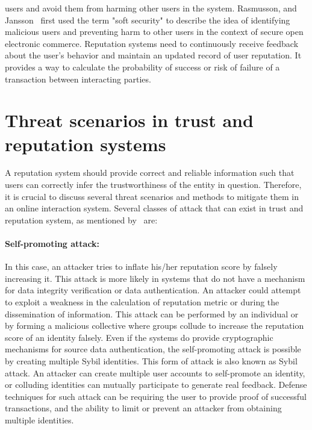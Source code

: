 users and avoid them from harming other users in the system. Rasmusson, and
Jansson~\cite{rasmusson1996simulated} first used the term "soft security" to
describe the idea of identifying malicious users and preventing harm to other
users in the context of secure open electronic commerce. Reputation systems
need to continuously receive feedback about the user's behavior and maintain an
updated record of user reputation. It provides a way to calculate the
probability of success or risk of failure of a transaction between interacting
parties.
\section{Threat scenarios in trust and reputation systems}
A reputation system should provide correct and reliable information such that
users can correctly infer the trustworthiness of the entity in question.
Therefore, it is crucial to discuss several threat scenarios and methods to
mitigate them in an online interaction system. Several classes of attack that
can exist in trust and reputation system, as mentioned
by~\cite{hoffman2009survey,marmol2009security} are:  
\paragraph{Self-promoting attack:} In this case, an attacker tries to inflate
his/her reputation score by falsely increasing it. This attack is more likely
in systems that do not have a mechanism for data integrity verification or data
authentication. An attacker could attempt to exploit a weakness in the
calculation of reputation metric or during the dissemination of information.
This attack can be performed by an individual or by forming a malicious
collective where groups collude to increase the reputation score of an identity
falsely. Even if the systems do provide cryptographic mechanisms for source
data authentication, the self-promoting attack is possible by creating multiple
Sybil identities. This form of attack is also known as Sybil attack. An
attacker can create multiple user accounts to self-promote an identity, or
colluding identities can mutually participate to generate real feedback.
Defense techniques for such attack can be requiring the user to provide proof
of successful transactions, and the ability to limit or prevent an attacker
from obtaining multiple identities. 
